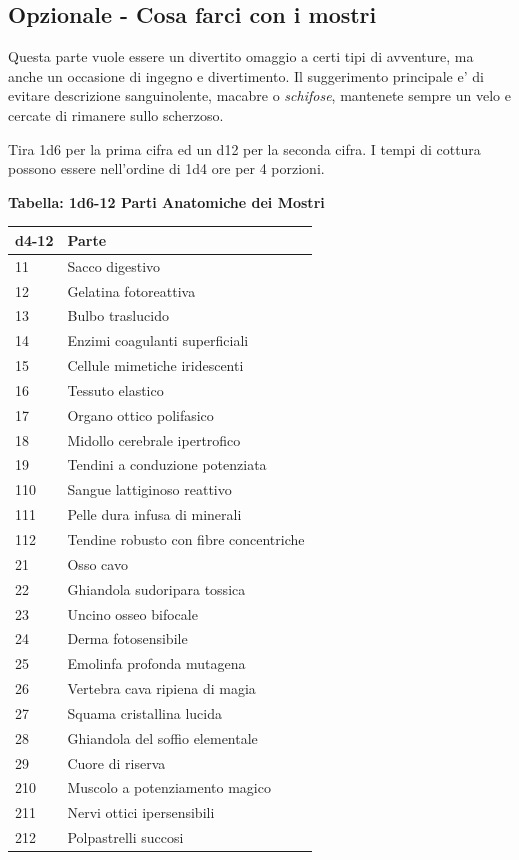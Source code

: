 \subsection{Opzionale - Cosa farci con i mostri}

\begin{multicols}{2}

Questa parte vuole essere un divertito omaggio a certi tipi di avventure, ma anche un occasione di ingegno e divertimento. Il suggerimento principale e' di evitare descrizione sanguinolente, macabre o \emph{schifose}, mantenete sempre un velo e cercate di rimanere sullo scherzoso.

Tira 1d6 per la prima cifra ed un d12 per la seconda cifra. I tempi di cottura possono essere nell'ordine di 1d4 ore per 4 porzioni.

\textbf{Tabella: 1d6-12 Parti Anatomiche dei Mostri}

\noindent\begin{tabularx}{0.50\textwidth}{lX}
	\textbf{d4-12}&\textbf{Parte}\\
	\toprule
	11 & Sacco digestivo \\
	12 & Gelatina fotoreattiva \\
	13 & Bulbo traslucido \\
	14 & Enzimi coagulanti superficiali \\
	15 & Cellule mimetiche iridescenti \\
	16 & Tessuto elastico \\
	17 & Organo ottico polifasico \\
	18 & Midollo cerebrale ipertrofico \\
	19 & Tendini a conduzione potenziata \\
	110 & Sangue lattiginoso reattivo \\
	111 & Pelle dura infusa di minerali \\
	112 & Tendine robusto con fibre concentriche \\

	21 & Osso cavo \\
	22 & Ghiandola sudoripara tossica \\
	23 & Uncino osseo bifocale \\
	24 & Derma fotosensibile \\
	25 & Emolinfa profonda mutagena \\
	26 & Vertebra cava ripiena di magia \\
	27 & Squama cristallina lucida \\
	28 & Ghiandola del soffio elementale \\
	29 & Cuore di riserva \\
	210 & Muscolo a potenziamento magico \\
	211 & Nervi ottici ipersensibili \\
	212 & Polpastrelli succosi\\


\end{tabularx}
\end{multicols}
